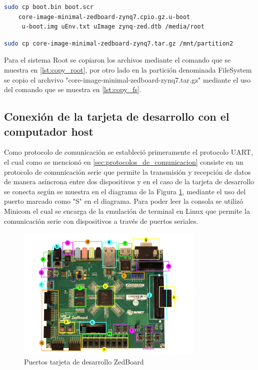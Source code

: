 \begin{lstlisting}[language=bash, caption={Copiar archivos root, Linux}, label=lst:copy_root]
    sudo cp boot.bin boot.scr 
    core-image-minimal-zedboard-zynq7.cpio.gz.u-boot
     u-boot.img uEnv.txt uImage zynq-zed.dtb /media/root
\end{lstlisting}

\begin{lstlisting}[language=bash, caption={Copiar sistema de archivos, Linux}, label=lst:copy_fs]
    sudo cp core-image-minimal-zedboard-zynq7.tar.gz /mnt/partition2
\end{lstlisting}

Para el sistema Root se copiaron los archivos mediante el comando que se muestra en \ref{lst:copy_root}, por otro lado en la partición denominada FileSystem se copio el archvivo "core-image-minimal-zedboard-zynq7.tar.gz" mediante el uso del comando que se muestra en \ref{lst:copy_fs}.

\subsection{Conexión de la tarjeta de desarrollo con el computador host}

Como protocolo de comunicación se estableció primeramente el protocolo UART, el cual como se mencionó en \ref{sec:protocolos_de_comunicacion} consiste en un protocolo de comunicación serie que permite la transmisión y recepción de datos de manera asíncrona entre dos dispositivos y en el caso de la tarjeta de desarrollo se conecta según se muestra en el diagrama de la Figura \ref{fig:puertos_zedboard}, mediante el uso del puerto marcado como "S" en el diagrama. Para poder leer la consola se utilizó Minicom el cual se encarga de la emulación de terminal en Linux que permite la comunicación serie con dispositivos a través de puertos seriales.

\begin{figure}[h!]
    \centering
    \includegraphics[width=0.8\textwidth]{fig/teorico/zedboard_raw.png}
    \caption{Puertos tarjeta de desarrollo ZedBoard}
    \label{fig:puertos_zedboard}
\end{figure}


